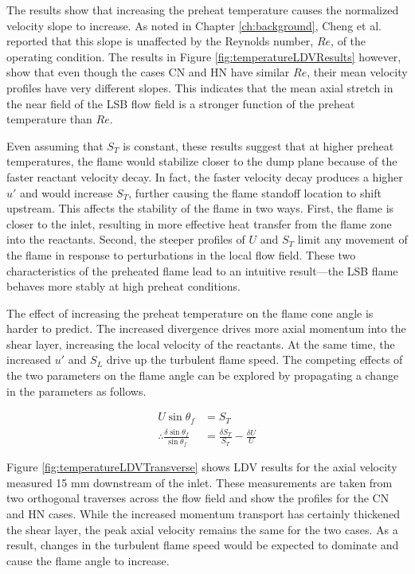 The results show that increasing the preheat temperature causes the normalized velocity slope to increase.
As noted in Chapter \ref{ch:background}, Cheng et al.\cite{2008-cheng-a} reported that this slope is unaffected by the Reynolds number, \(Re\), of the operating condition.
The results in Figure \ref{fig:temperatureLDVResults} however, show that even though the cases CN and HN have similar \(Re\), their mean velocity profiles have very different slopes.
This indicates that the mean axial stretch in the near field of the LSB flow field is a stronger function of the preheat temperature than \(Re\).

Even assuming that \(S_T\) is constant, these results suggest that at higher preheat temperatures, the flame would stabilize closer to the dump plane because of the faster reactant velocity decay.
In fact, the faster velocity decay produces a higher \(u'\) and would increase \(S_T\), further causing the flame standoff location to shift upstream.
This affects the stability of the flame in two ways.
First, the flame is closer to the inlet, resulting in more effective heat transfer from the flame zone into the reactants.
Second, the steeper profiles of \(U\) and \(S_T\) limit any movement of the flame in response to perturbations in the local flow field.
These two characteristics of the preheated flame lead to an intuitive result---the LSB flame behaves more stably at high preheat conditions.

The effect of increasing the preheat temperature on the flame cone angle is harder to predict.
The increased divergence drives more axial momentum into the shear layer, increasing the local velocity of the reactants.
At the same time, the increased \(u'\) and \(S_L\) drive up the turbulent flame speed.
The competing effects of the two parameters on the flame angle can be explored by propagating a change in the parameters as follows.

\begin{align}
  U \sin \theta_f &= S_T \nonumber \\
  \therefore \frac{ \delta \sin \theta_f }{ \sin \theta_f } &= \frac{ \delta S_T }{ S_T } - \frac{ \delta U }{ U }
\end{align}

Figure \ref{fig:temperatureLDVTransverse} shows LDV results for the axial velocity measured 15 mm downstream of the inlet.
These measurements are taken from two orthogonal traverses across the flow field and show the profiles for the CN and HN cases.
While the increased momentum transport has certainly thickened the shear layer, the peak axial velocity remains the same for the two cases.
As a result, changes in the turbulent flame speed would be expected to dominate and cause the flame angle to increase.

